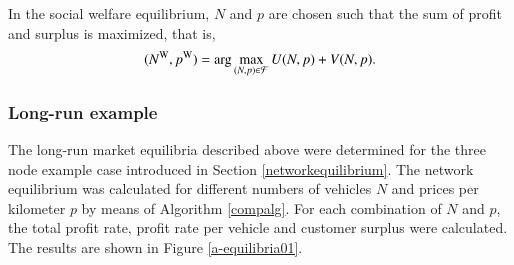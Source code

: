 \documentclass[dissertation,draft*]{aaltoseries}
\begin{document}
In the social welfare equilibrium, $N$ and $p$ are chosen such that the sum of profit and surplus is maximized, that is, 
\begin{align}
\label{welfare}
(N^{\rm W},p^{\rm W}) = \arg \max_{(N,p) \in \mathcal{F}} U(N,p) + V(N,p). 
\end{align}


\subsubsection{Long-run example}
The long-run market equilibria described above were determined for the three node example case introduced
in Section \ref{networkequilibrium}. The network equilibrium was calculated for different numbers
of vehicles $N$ and prices per kilometer $p$ by means of Algorithm \ref{compalg}.
For each combination of $N$ and $p$, the total profit rate, profit 
rate per vehicle and customer surplus were calculated. The results are shown in Figure \ref{a-equilibria01}.
\end{document}
